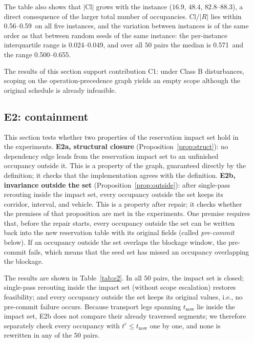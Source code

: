 \documentclass[manuscript,screen,review]{acmart}
\newcommand{\NPairs}{50}
\newcommand{\EoneCloLo}{0.56}
\newcommand{\EoneCloHi}{0.59}
\newcommand{\EoneFracIqrLo}{0.024}  %
\newcommand{\EoneFracIqrHi}{0.049}  %
\newcommand{\EoneFracMed}{0.571}    %
\newcommand{\EoneFracMin}{0.500}    %
\newcommand{\EoneFracMax}{0.655}    %
\begin{document}
The table also shows that \(|\mathrm{Cl}|\) grows with the instance (\(16.9\), \(48.4\), \(82.8\)--\(88.3\)), a direct consequence of the larger total number of occupancies.
\(\mathrm{Cl}/|R|\) lies within \EoneCloLo--\EoneCloHi\ on all five instances, and the variation between instances is of the same order as that between random seeds of the same instance:
the per-instance interquartile range is \EoneFracIqrLo--\EoneFracIqrHi, and over all \(\NPairs\) pairs the median is \EoneFracMed\ and the range \EoneFracMin--\EoneFracMax.

The results of this section support contribution C1: under Class B disturbances, scoping on the operation-precedence graph yields an empty scope although the original schedule is already infeasible.

\subsection{E2: containment}
\label{sec:e2}

This section tests whether two properties of the reservation impact set hold in the experiments.
\textbf{E2a, structural closure} (Proposition~\ref{prop:struct}): no dependency edge leads from the reservation impact set to an unfinished occupancy outside it.
This is a property of the graph, guaranteed directly by the definition; it checks that the implementation agrees with the definition.
\textbf{E2b, invariance outside the set} (Proposition~\ref{prop:outside}): after single-pass rerouting inside the impact set, every occupancy outside the set keeps its corridor, interval, and vehicle.
This is a property after repair; it checks whether the premises of that proposition are met in the experiments.
One premise requires that, before the repair starts, every occupancy outside the set can be written back into the new reservation table with its original fields (called \emph{pre-commit} below).
If an occupancy outside the set overlaps the blockage window, the pre-commit fails, which means that the seed set has missed an occupancy overlapping the blockage.

The results are shown in Table~\ref{tab:e2}. In all \(\NPairs\) pairs, the impact set is closed;
single-pass rerouting inside the impact set (without scope escalation) restores feasibility; and every occupancy outside the set keeps its original values, i.e., no pre-commit failure occurs.
Because transport legs spanning \(t_{\mathrm{now}}\) lie inside the impact set, E2b does not compare their already traversed segments;
we therefore separately check every occupancy with \(t^e\le t_{\mathrm{now}}\) one by one, and none is rewritten in any of the \(\NPairs\) pairs.
\end{document}
